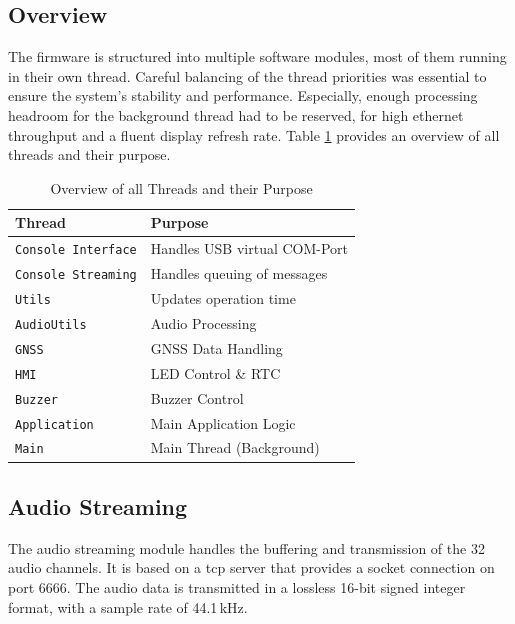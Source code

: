 \subsection{Overview}
The firmware is structured into multiple software modules, most of them running in their own thread.
Careful balancing of the thread priorities was essential to ensure the system's stability and performance.
Especially, enough processing headroom for the background thread had to be reserved, for high ethernet throughput and a fluent display refresh rate.
Table \ref{tab:threads} provides an overview of all threads and their purpose.
\begin{table}[h]
	\centering
	\begin{tabular}{|l|l|}
		\hline
		Thread                     & Purpose                      \\ \hline
		\texttt{Console Interface} & Handles USB virtual COM-Port \\ \hline
		\texttt{Console Streaming} & Handles queuing of messages  \\ \hline
		\texttt{Utils}             & Updates operation time       \\ \hline
		\texttt{AudioUtils}        & Audio Processing             \\ \hline
		\texttt{GNSS}              & GNSS Data Handling           \\ \hline
		\texttt{HMI}               & LED Control \& RTC           \\ \hline
		\texttt{Buzzer}            & Buzzer Control               \\ \hline
		\texttt{Application}       & Main Application Logic       \\ \hline
		\texttt{Main}              & Main Thread (Background)     \\ \hline
	\end{tabular}
	\caption{Overview of all Threads and their Purpose}
	\label{tab:threads}
\end{table}

\subsection{Audio Streaming}
The audio streaming module handles the buffering and transmission of the 32 audio channels.
It is based on a \acrshort{tcp} server that provides a socket connection on port 6666.
The audio data is transmitted in a lossless 16-bit signed integer format, with a sample rate of 44.1\,kHz.


